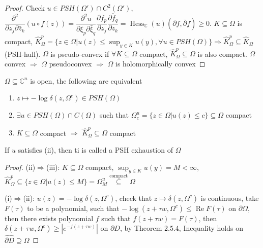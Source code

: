 \documentclass[../main.tex]{subfiles}
\begin{document}
\begin{proof}
Check $u\in PSH(\Omega')\cap C^2(\Omega')$, $\dfrac{\partial^2}{\partial z_j\partial\bar z_k}(u\circ f(z))=\dfrac{\partial^2 u}{\partial\xi_p\partial\bar\xi_q}\dfrac{\partial f_p}{\partial z_j}\overline{\dfrac{\partial f_q}{\partial z_k}}=\operatorname{Hess}_\mathbb{C}(u)(\partial f,\bar\partial f)\geq0$. $K\subseteq\Omega$ is compact, $\hat K_\Omega^p=\{z\in\Omega|u(z)\leq\sup_{y\in K}u(y),\forall u\in PSH(\Omega)\}\Rightarrow\hat K_\Omega^p\subseteq\hat K_\Omega$ (PSH-hull). $\Omega$ is pseudo-convex if $\forall K\subseteq\Omega$ compact, $\hat K_\Omega^p\subseteq\Omega$ is also compact. $\Omega$ convex $\Rightarrow$ $\Omega$ pseudoconvex $\Rightarrow$ $\Omega$ is holomorphically convex
\end{proof}

\begin{theorem}
$\Omega\subseteq\mathbb C^n$ is open, the following are equivalent
\begin{enumerate}[label=(\roman*)]
\item $z\mapsto-\log\delta(z,\Omega^c)\in PSH(\Omega)$
\item $\exists u\in PSH(\Omega)\cap C(\Omega)$ such that $\Omega^u_c=\{z\in\Omega|u(z)\leq c\}\subseteq\Omega$ compact
\item $K\subseteq\Omega$ compact $\Rightarrow$ $\hat K^p_\Omega\subseteq\Omega$ compact
\end{enumerate}
\end{theorem}

\begin{remark}
If $u$ satisfies (ii), then ti is called a PSH exhaustion of $\Omega$
\end{remark}

\begin{proof}
(ii)$\Rightarrow$(iii): $K\subseteq\Omega$ compact, $\sup_{y\in K}u(y)=M<\infty$, $\hat K^p_\Omega\subseteq\{z\in\Omega|u(z)\leq M\}=\Omega^u_M\overset{\text{compact}}{\subseteq}\Omega$ \par
(i)$\Rightarrow$(ii): $u(z)=-\log\delta(z,\Omega^c)$, check that $z\mapsto\delta(z,\Omega^c)$ is continuous, take $F(\tau)$ to be a polynomial, such that $-\log(z+\tau w,\Omega^c)\leq\operatorname{Re}F(\tau)$ on $\partial\Omega$, then there exists polynomial $f$ such that $f(z+\tau w)=F(\tau)$, then $\delta(z+\tau w,\Omega^c)\geq|e^{-f(z+\tau w)}|$ on $\partial D$, by Theorem 2.5.4, Inequality holds on $\widehat{\partial D}\supseteq\Omega$
\end{proof}
\end{document}
